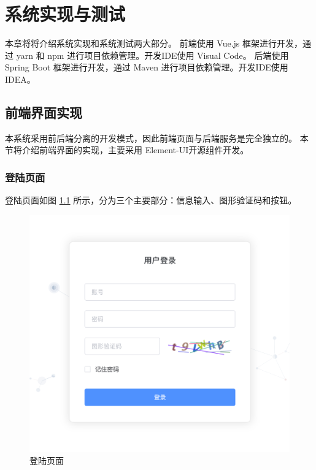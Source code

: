 \chapter{系统实现与测试}
本章将将介绍系统实现和系统测试两大部分。
前端使用 Vue.js 框架进行开发，通过 yarn 和 npm 进行项目依赖管理。开发IDE使用 Visual Code。 
后端使用 Spring Boot 框架进行开发，通过 Maven 进行项目依赖管理。开发IDE使用 IDEA。 

\section{前端界面实现}
本系统采用前后端分离的开发模式，因此前端页面与后端服务是完全独立的。
本节将介绍前端界面的实现，主要采用 Element-UI开源组件开发。

\subsection{登陆页面}

登陆页面如图 \ref{Fig:login} 所示，分为三个主要部分：信息输入、图形验证码和按钮。

\begin{figure}[ht]
    \centering
    \includegraphics[width=0.8\linewidth]{./Figure/IMG_login.png}
    \caption{登陆页面}\label{Fig:login}
\end{figure}

